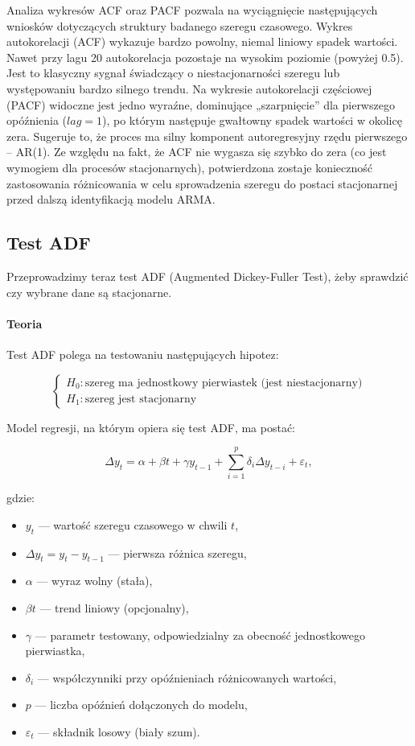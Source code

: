 \documentclass{article}
\begin{document}
Analiza wykresów ACF oraz PACF pozwala na wyciągnięcie następujących wniosków dotyczących struktury badanego szeregu czasowego.
Wykres autokorelacji (ACF) wykazuje bardzo powolny, niemal liniowy spadek wartości. Nawet przy lagu 20 autokorelacja pozostaje na wysokim poziomie (powyżej 0.5). Jest to klasyczny sygnał świadczący o niestacjonarności szeregu lub występowaniu bardzo silnego trendu.
Na wykresie autokorelacji częściowej (PACF) widoczne jest jedno wyraźne, dominujące „szarpnięcie” dla pierwszego opóźnienia ($lag=1$), po którym następuje gwałtowny spadek wartości w okolicę zera. Sugeruje to, że proces ma silny komponent autoregresyjny rzędu pierwszego – AR(1).
Ze względu na fakt, że ACF nie wygasza się szybko do zera (co jest wymogiem dla procesów stacjonarnych), potwierdzona zostaje konieczność zastosowania różnicowania w celu sprowadzenia szeregu do postaci stacjonarnej przed dalszą identyfikacją modelu ARMA.

\subsection{Test ADF}
Przeprowadzimy teraz test ADF (Augmented Dickey-Fuller Test), żeby sprawdzić czy wybrane dane są stacjonarne. 
\paragraph{Teoria}
Test ADF polega na testowaniu następujących hipotez: 

\[
\begin{cases}
H_0: \text{szereg ma jednostkowy pierwiastek (jest niestacjonarny)} \\
H_1: \text{szereg jest stacjonarny}
\end{cases}
\]

Model regresji, na którym opiera się test ADF, ma postać:

\[
\Delta y_t = \alpha + \beta t + \gamma y_{t-1} + \sum_{i=1}^p \delta_i \Delta y_{t-i} + \varepsilon_t,
\]

gdzie:

\begin{itemize}
    \item \( y_t \) --- wartość szeregu czasowego w chwili \( t \),
    \item \( \Delta y_t = y_t - y_{t-1} \) --- pierwsza różnica szeregu,
    \item \( \alpha \) --- wyraz wolny (stała),
    \item \( \beta t \) --- trend liniowy (opcjonalny),
    \item \( \gamma \) --- parametr testowany, odpowiedzialny za obecność jednostkowego pierwiastka,
    \item \( \delta_i \) --- współczynniki przy opóźnieniach różnicowanych wartości,
    \item \( p \) --- liczba opóźnień dołączonych do modelu,
    \item \( \varepsilon_t \) --- składnik losowy (biały szum).
\end{itemize}
\end{document}
